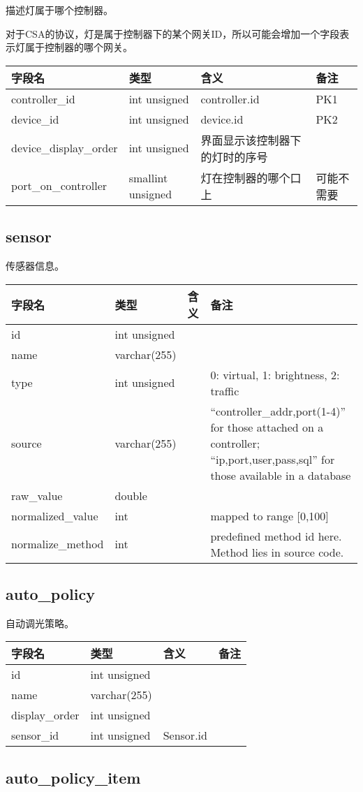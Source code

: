 描述灯属于哪个控制器。

对于CSA的协议，灯是属于控制器下的某个网关ID，所以可能会增加一个字段表示灯属于控制器的哪个网关。

\begin{longtabu}[c]{@{}lXXX@{}}
\toprule
字段名 & 类型 & 含义 & 备注\tabularnewline
\midrule
\endhead
controller\_id & int unsigned & controller.id & PK1\tabularnewline
device\_id & int unsigned & device.id & PK2\tabularnewline
device\_display\_order & int unsigned & 界面显示该控制器下的灯时的序号
&\tabularnewline
port\_on\_controller & smallint unsigned & 灯在控制器的哪个口上 &
可能不需要\tabularnewline
\bottomrule
\end{longtabu}

\subsection{sensor}\label{sensor}

传感器信息。

\begin{longtabu}[c]{@{}lXXX@{}}
\toprule
字段名 & 类型 & 含义 & 备注\tabularnewline
\midrule
\endhead
id & int unsigned & &\tabularnewline
name & varchar(255) & &\tabularnewline
type & int unsigned & & 0: virtual, 1: brightness, 2:
traffic\tabularnewline
source & varchar(255) & & ``controller\_addr,port(1-4)'' for those
attached on a controller; ``ip,port,user,pass,sql'' for those available
in a database\tabularnewline
raw\_value & double & &\tabularnewline
normalized\_value & int & & mapped to range {[}0,100{]}\tabularnewline
normalize\_method & int & & predefined method id here. Method lies in
source code.\tabularnewline
\bottomrule
\end{longtabu}

\subsection{auto\_policy}\label{autoux5fpolicy}

自动调光策略。

\begin{longtabu}[c]{@{}lXXX@{}}
\toprule
字段名 & 类型 & 含义 & 备注\tabularnewline
\midrule
\endhead
id & int unsigned & &\tabularnewline
name & varchar(255) & &\tabularnewline
display\_order & int unsigned & &\tabularnewline
sensor\_id & int unsigned & Sensor.id &\tabularnewline
\bottomrule
\end{longtabu}

\subsection{auto\_policy\_item}\label{autoux5fpolicyux5fitem}


